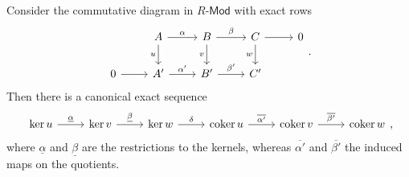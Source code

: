 \documentclass[../Main]{subfiles}
\begin{document}
\begin{lem}
	Consider the commutative diagram in $R\text{-}\mathsf{Mod}$ with exact rows
	\begin{equation}
	\begin{tikzcd}
		&
		A \arrow[r, "\alpha", rightarrow] \arrow[d, "u"', rightarrow] &
		B \arrow[r, "\beta", rightarrow] \arrow[d, "v"', rightarrow] &
		C \arrow[r, "", rightarrow] \arrow[d, "w"', rightarrow] &
		0 \\
		0 \arrow[r, "", rightarrow] &
		A' \arrow[r, "\alpha'", rightarrow] &
		B' \arrow[r, "\beta'", rightarrow] &
		C' &
	\end{tikzcd}
	.\end{equation}
	Then there is a canonical exact sequence
	\begin{equation}
	\begin{tikzcd}
		\ker u \arrow[r, "\underline{\alpha}", rightarrow] &
		\ker v \arrow[r, "\underline{\beta}", rightarrow] &
		\ker w \arrow[r, "\delta", rightarrow] &
		\mathrm{coker}\, u \arrow[r, "\overline{\alpha'}", rightarrow] &
		\mathrm{coker}\, v \arrow[r, "\overline{\beta'}", rightarrow] &
		\mathrm{coker}\, w
	\end{tikzcd}
	,\end{equation} 
	where $\underline{\alpha}$ and $\underline{\beta}$ are the restrictions to the kernels,
	whereas $\overline{\alpha'}$ and $\overline{\beta'}$ the induced maps on the quotients.
\end{lem} 
\end{document}
